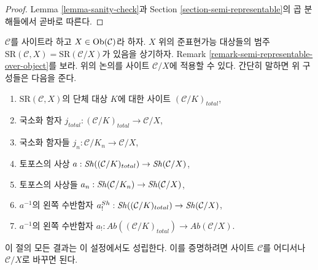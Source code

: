 \begin{proof}
Lemma \ref{lemma-sanity-check}과 Section
\ref{section-semi-representable}의 곱 분해들에서 곧바로 따른다.
\end{proof}

\begin{remark}[대상 위에서의 변형]
\label{remark-augmentation-over-object}
$\mathcal{C}$를 사이트라 하고 $X \in \mathop{\mathrm{Ob}}\nolimits(\mathcal{C})$라 하자.
$X$ 위의 준표현가능 대상들의 범주
$\text{SR}(\mathcal{C}, X) = \text{SR}(\mathcal{C}/X)$가 있음을 상기하자.
Remark \ref{remark-semi-representable-over-object}를 보라.
위의 논의를 사이트 $\mathcal{C}/X$에 적용할 수 있다.
간단히 말하면 위 구성들은 다음을 준다.
\begin{enumerate}
\item $\text{SR}(\mathcal{C}, X)$의 단체 대상 $K$에 대한 사이트
$(\mathcal{C}/K)_{total}$,
\item 국소화 함자
$j_{total} : (\mathcal{C}/K)_{total} \to \mathcal{C}/X$,
\item 국소화 함자들 $j_n : \mathcal{C}/K_n \to \mathcal{C}/X$,
\item 토포스의 사상
$a : \mathop{\mathit{Sh}}\nolimits((\mathcal{C}/K)_{total}) \to \mathop{\mathit{Sh}}\nolimits(\mathcal{C}/X)$,
\item 토포스의 사상들
$a_n : \mathop{\mathit{Sh}}\nolimits(\mathcal{C}/K_n) \to \mathop{\mathit{Sh}}\nolimits(\mathcal{C}/X)$,
\item $a^{-1}$의 왼쪽 수반함자
$a^{Sh}_! : \mathop{\mathit{Sh}}\nolimits((\mathcal{C}/K)_{total}) \to \mathop{\mathit{Sh}}\nolimits(\mathcal{C}/X)$,
\item $a^{-1}$의 왼쪽 수반함자
$a_! : \textit{Ab}((\mathcal{C}/K)_{total}) \to
\textit{Ab}(\mathcal{C}/X)$.
\end{enumerate}
이 절의 모든 결과는 이 설정에서도 성립한다. 이를 증명하려면
사이트 $\mathcal{C}$를 어디서나 $\mathcal{C}/X$로 바꾸면 된다.
\end{remark}

